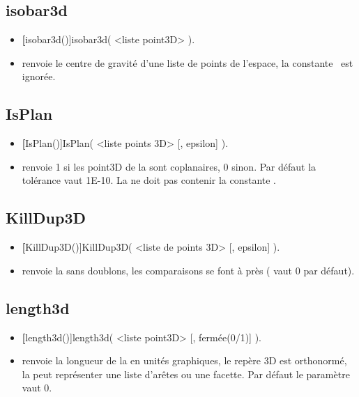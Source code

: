 \subsection{isobar3d}
\begin{itemize}
 \item \util \textbf[isobar3d()]{isobar3d( <liste point3D> )}.
 \item \desc renvoie le centre de gravité d'une liste de points de l'espace, la constante \jump\ est ignorée.
\end{itemize}

\subsection{IsPlan}
\begin{itemize}
 \item \util \textbf[IsPlan()]{IsPlan( <liste points 3D> [, epsilon] )}.
 \item \desc renvoie 1 si les point3D de la  sont coplanaires, 0 sinon. Par défaut la tolérance  vaut 1E-10. La  ne doit pas contenir la constante \jump.
\end{itemize}


\subsection{KillDup3D}
\begin{itemize}
 \item \util \textbf[KillDup3D()]{KillDup3D( <liste de points 3D> [, epsilon] )}.
 \item \desc renvoie la  sans doublons, les comparaisons se font à  près ( vaut $0$ par défaut).
\end{itemize}

\subsection{length3d}
\begin{itemize}
 \item \util \textbf[length3d()]{length3d( <liste point3D> [, fermée(0/1)] )}.
 \item \desc renvoie la longueur de la  en unités graphiques, le repère 3D est orthonormé, la  peut représenter une liste d'arêtes ou une facette. Par défaut le paramètre  vaut $0$.
\end{itemize}


